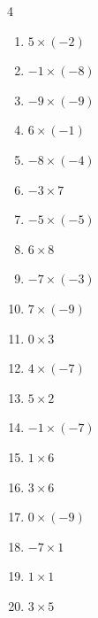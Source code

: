 \begin{multicols}{4}
\begin{enumerate}
  \item $5\times (-2)$
        \phantom{$=-10$}

  \item $-1\times (-8)$
        \phantom{$=8$}

  \item $-9\times (-9)$
        \phantom{$=81$}

  \item $6\times (-1)$
        \phantom{$=-6$}

  \item $-8\times (-4)$
        \phantom{$=32$}

  \item $-3\times 7$
        \phantom{$=-21$}

  \item $-5\times (-5)$
        \phantom{$=25$}

  \item $6\times 8$
        \phantom{$=48$}

  \item $-7\times (-3)$
        \phantom{$=21$}

  \item $7\times (-9)$
        \phantom{$=-63$}

\columnbreak %

\resetques

  \item $0\times 3$
        \phantom{$=0$}

  \item $4\times (-7)$
        \phantom{$=-28$}

  \item $5\times 2$
        \phantom{$=10$}

  \item $-1\times (-7)$
        \phantom{$=7$}

  \item $1\times 6$
        \phantom{$=6$}

  \item $3\times 6$
        \phantom{$=18$}

  \item $0\times (-9)$
        \phantom{$=0$}

  \item $-7\times 1$
        \phantom{$=-7$}

  \item $1\times 1$
        \phantom{$=1$}

  \item $3\times 5$
        \phantom{$=15$}


\end{enumerate}
\end{multicols}
